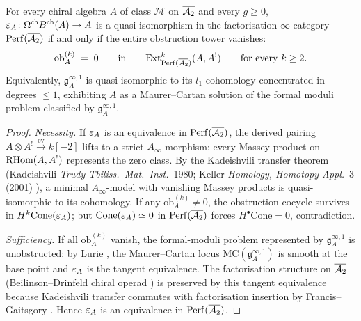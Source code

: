 \begin{theorem}
\label{thm:mc5-infty-one-obstruction-tower}
\ClaimStatusProvedHere{}%
For every chiral algebra $A$ of class $\mathcal M$ on $\overline{\mathcal{A}_2}$ and
every $g\ge 0$, $\varepsilon_A\colon\Omega^{\mathrm{ch}}B^{\mathrm{ch}}(A)
\to A$ is a quasi-isomorphism in the factorisation $\infty$-category
$\mathrm{Perf}(\overline{\mathcal{A}_2})$ if and only if the entire obstruction tower
vanishes:
\[
\mathrm{ob}^{(k)}_A \;=\; 0
\qquad\text{in}\qquad
\mathrm{Ext}^k_{\mathrm{Perf}(\overline{\mathcal{A}_2})}(A,A^!)
\qquad\text{for every } k\ge 2.
\]
Equivalently, $\mathfrak{g}^{\infty,1}_A$ is quasi-isomorphic to its
$l_1$-cohomology concentrated in degrees $\le 1$, exhibiting $A$ as
a Maurer--Cartan solution of the formal moduli problem classified by
$\mathfrak{g}^{\infty,1}_A$.
\end{theorem}

\begin{proof}
\emph{Necessity.} If $\varepsilon_A$ is an equivalence in
$\mathrm{Perf}(\overline{\mathcal{A}_2})$, the derived pairing
$A\otimes A^!\xrightarrow{\mathrm{ev}} k[-2]$ lifts to a strict
$A_\infty$-morphism; every Massey product on $\mathrm{RHom}(A,A^!)$
represents the zero class. By the Kadeishvili transfer theorem
(Kadeishvili \textit{Trudy Tbiliss.~Mat.~Inst.}~1980; Keller
\textit{Homology, Homotopy Appl.}~3 (2001) ), a
minimal $A_\infty$-model with vanishing Massey products is
quasi-isomorphic to its cohomology. If any $\mathrm{ob}^{(k)}_A\neq
0$, the obstruction cocycle survives in
$H^k\mathrm{Cone}(\varepsilon_A)$; but
$\mathrm{Cone}(\varepsilon_A)\simeq 0$ in $\mathrm{Perf}(\overline{\mathcal{A}_2})$ forces
$H^\bullet\mathrm{Cone}=0$, contradiction.

\emph{Sufficiency.} If all $\mathrm{ob}^{(k)}_A$ vanish, the
formal-moduli problem represented by $\mathfrak{g}^{\infty,1}_A$ is
unobstructed: by Lurie \cite[Theorem~5.5.1.1]{LurieHA}, the
Maurer--Cartan locus $\mathrm{MC}(\mathfrak{g}^{\infty,1}_A)$ is
smooth at the base point and $\varepsilon_A$ is the tangent equivalence.
The factorisation structure on $\overline{\mathcal{A}_2}$
(Beilinson--Drinfeld chiral operad \cite[]{BD}) is
preserved by this tangent equivalence because Kadeishvili transfer
commutes with factorisation insertion by Francis--Gaitsgory
\cite{FrancisGaitsgory2012} . Hence $\varepsilon_A$ is
an equivalence in $\mathrm{Perf}(\overline{\mathcal{A}_2})$.
\end{proof}

